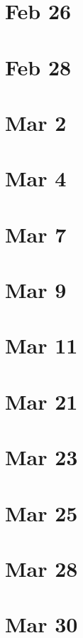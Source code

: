 \documentclass[12pt]{book}
\newcommand{\<}{\langle}
\renewcommand{\>}{\rangle}
\numberwithin{equation}{section}
\theoremstyle{plain}
\theoremstyle{definition}
\theoremstyle{remark}
\begin{document}
\section*{Feb 26}

\section*{Feb 28}

\section*{Mar 2}

\section*{Mar 4}

\section*{Mar 7}

\section*{Mar 9}

\section*{Mar 11}

\section*{Mar 21}

\section*{Mar 23}

\section*{Mar 25}

\section*{Mar 28}

\section*{Mar 30}
\end{document}
